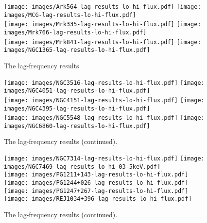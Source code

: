 \documentclass{article}
\begin{document}
\begin{figure}
\centering
\texttt{[image: images/Ark564-lag-results-lo-hi-flux.pdf]}
\texttt{[image: images/MCG-lag-results-lo-hi-flux.pdf]}\\
\vspace{0.5cm}
\texttt{[image: images/Mrk335-lag-results-lo-hi-flux.pdf]}
\texttt{[image: images/Mrk766-lag-results-lo-hi-flux.pdf]}\\
\vspace{0.5cm}
\texttt{[image: images/Mrk841-lag-results-lo-hi-flux.pdf]}
\texttt{[image: images/NGC1365-lag-results-lo-hi-flux.pdf]}
\caption[The lag-frequency results]{The lag-frequency results}
\label{fig:lagfreq-results}
\end{figure}

\begin{figure}
    \ContinuedFloat
\centering
\texttt{[image: images/NGC3516-lag-results-lo-hi-flux.pdf]}
\texttt{[image: images/NGC4051-lag-results-lo-hi-flux.pdf]}\\
\vspace{0.5cm}
\texttt{[image: images/NGC4151-lag-results-lo-hi-flux.pdf]}
\texttt{[image: images/NGC4395-lag-results-lo-hi-flux.pdf]}\\
\vspace{0.5cm}
\texttt{[image: images/NGC5548-lag-results-lo-hi-flux.pdf]}
\texttt{[image: images/NGC6860-lag-results-lo-hi-flux.pdf]}
\caption[The lag-frequency results (continued)]{The lag-frequency results (continued).}
\end{figure}

\begin{figure}
    \ContinuedFloat
\centering
\texttt{[image: images/NGC7314-lag-results-lo-hi-flux.pdf]}
\texttt{[image: images/NGC7469-lag-results-lo-hi-03-5keV.pdf]}\\
\vspace{0.5cm}
\texttt{[image: images/PG1211+143-lag-results-lo-hi-flux.pdf]} 
\texttt{[image: images/PG1244+026-lag-results-lo-hi-flux.pdf]}\\
\vspace{0.5cm}
\texttt{[image: images/PG1247+267-lag-results-lo-hi-flux.pdf]}
\texttt{[image: images/REJ1034+396-lag-results-lo-hi-flux.pdf]}
\caption[The lag-frequency results (continued)]{The lag-frequency results (continued).}
\end{figure}
\end{document}
